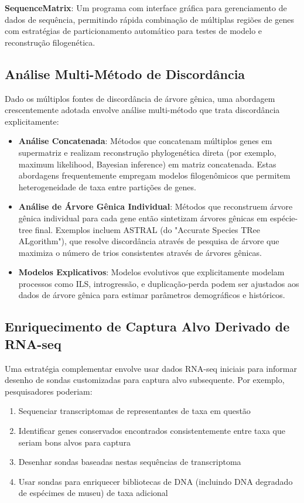 \textbf{SequenceMatrix}: Um programa com interface gráfica para gerenciamento de dados de sequência, permitindo rápida combinação de múltiplas regiões de genes com estratégias de particionamento automático para testes de modelo e reconstrução filogenética.

\subsection{Análise Multi-Método de Discordância}

Dado os múltiplos fontes de discordância de árvore gênica, uma abordagem crescentemente adotada envolve análise multi-método que trata discordância explicitamente:

\begin{itemize}
\item \textbf{Análise Concatenada}: Métodos que concatenam múltiplos genes em supermatriz e realizam reconstrução phylogenética direta (por exemplo, maximum likelihood, Bayesian inference) em matriz concatenada. Estas abordagens frequentemente empregam modelos filogenômicos que permitem heterogeneidade de taxa entre partições de genes.

\item \textbf{Análise de Árvore Gênica Individual}: Métodos que reconstruem árvore gênica individual para cada gene então sintetizam árvores gênicas em espécie-tree final. Exemplos incluem ASTRAL (do "Accurate Species TRee ALgorithm"), que resolve discordância através de pesquisa de árvore que maximiza o número de trios consistentes através de árvores gênicas.

\item \textbf{Modelos Explicativos}: Modelos evolutivos que explicitamente modelam processos como ILS, introgressão, e duplicação-perda podem ser ajustados aos dados de árvore gênica para estimar parâmetros demográficos e históricos.
\end{itemize}

\subsection{Enriquecimento de Captura Alvo Derivado de RNA-seq}

Uma estratégia complementar envolve usar dados RNA-seq iniciais para informar desenho de sondas customizadas para captura alvo subsequente. Por exemplo, pesquisadores poderiam:

\begin{enumerate}
\item Sequenciar transcriptomas de representantes de taxa em questão
\item Identificar genes conservados encontrados consistentemente entre taxa que seriam bons alvos para captura
\item Desenhar sondas baseadas nestas sequências de transcriptoma
\item Usar sondas para enriquecer bibliotecas de DNA (incluindo DNA degradado de espécimes de museu) de taxa adicional
\end{enumerate}

